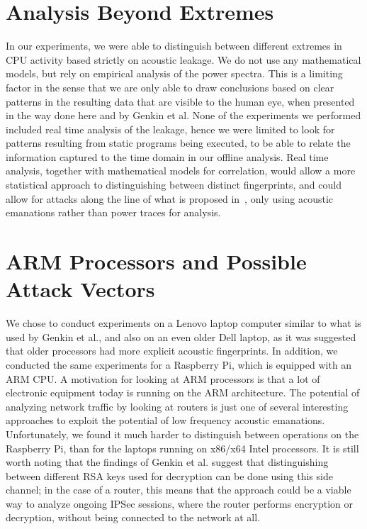 \section{Analysis Beyond Extremes}
In our experiments, we were able to distinguish between different extremes in CPU activity based strictly on acoustic leakage. 
We do not use any mathematical models, but rely on empirical analysis of the power spectra. 
This is a limiting factor in the sense that we are only able to draw conclusions based on clear patterns in the resulting data that are visible to the human eye, when presented in the way done here and by Genkin et al.
None of the experiments we performed included real time analysis of the leakage, hence we were limited to look for patterns resulting from static programs being executed, to be able to relate the information captured to the time domain in our offline analysis.
Real time analysis, together with mathematical models for correlation, would allow a more statistical approach to distinguishing between distinct fingerprints, and could allow for attacks along the line of what is proposed in~\cite{DBLP:conf/crypto/KocherJJ99}, only using acoustic emanations rather than power traces for analysis.


\section{ARM Processors and Possible Attack Vectors}
We chose to conduct experiments on a Lenovo laptop computer similar to what is used by Genkin et al., and also on an even older Dell laptop, as it was suggested that older processors had more explicit acoustic fingerprints.
In addition, we conducted the same experiments for a Raspberry Pi, which is equipped with an ARM CPU.
A motivation for looking at ARM processors is that a lot of electronic equipment today is running on the ARM architecture.
The potential of analyzing network traffic by looking at routers is just one of several interesting approaches to exploit the potential of low frequency acoustic emanations.
Unfortunately, we found it much harder to distinguish between operations on the Raspberry Pi, than for the laptops running on x86/x64 Intel processors.
It is still worth noting that the findings of Genkin et al. suggest that distinguishing between different RSA keys used for decryption can be done using this side channel; in the case of a router, this means that the approach could be a viable way to analyze ongoing IPSec sessions, where the router performs encryption or decryption, without being connected to the network at all.


